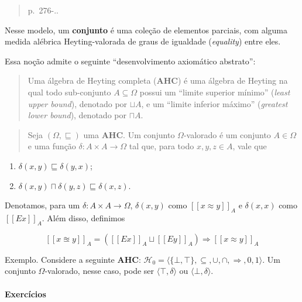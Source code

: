 \begin{quote}
p.~276-..
\end{quote}

Nesse modelo, um \textbf{conjunto} é uma coleção de elementos parciais,
com alguma medida alébrica Heyting-valorada de graus de igualdade
(\emph{equality}) entre eles.

Essa noção admite o seguinte ``desenvolvimento axiomático abstrato'':

\begin{quote}
Uma álgebra de Heyting completa (\textbf{AHC}) é uma álgebra de Heyting
na qual todo sub-conjunto \(A \subseteq \Omega\) possui um ``limite
superior mínimo'' (\emph{least upper bound}), denotado por \(\sqcup A\),
e um ``limite inferior máximo'' (\emph{greatest lower bound}), denotado
por \(\sqcap A\).
\end{quote}

\begin{quote}
Seja \((\Omega, \sqsubseteq)\) uma \textbf{AHC}. Um conjunto
\(\Omega\)-valorado é um conjunto \(A \in \Omega\) e uma função
\(\delta : A \times A \rightarrow \Omega\) tal que, para todo
\(x, y, z \in A\), vale que
\end{quote}

\begin{enumerate}
\def\labelenumi{\arabic{enumi}.}
\tightlist
\item
  \(\delta (x, y) \sqsubseteq \delta (y,x)\);
\item
  \(\delta (x, y) \sqcap \delta (y, z) \sqsubseteq \delta (x, z)\).
\end{enumerate}

Denotamos, para um \(\delta : A \times A \rightarrow \Omega\),
\(\delta(x,y)\) como \([[ x \approx y]]_A\) e \(\delta (x, x)\) como
\([[Ex]]_A\). Além disso, definimos

\[
[[ x \approxeq y ]]_A = ([[Ex]]_A \sqcup [[Ey]]_A) \Rightarrow [[x \approx y]]_A
\]

Exemplo. Considere a seguinte \textbf{AHC}:
\(\mathcal{H}_{0} = \langle \{\bot,\top\}, \subseteq, \cup, \cap, \Rightarrow, 0, 1 \rangle\).
Um conjunto \(\Omega\)-valorado, nesse caso, pode ser
\(\langle \top, \delta \rangle\) ou \(\langle \bot, \delta \rangle\).

\hypertarget{exercuxedcios-1}{%
\paragraph{Exercícios}\label{exercuxedcios-1}}

